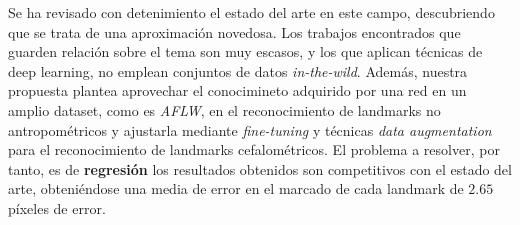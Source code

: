 \medskip

\noindent Se ha revisado con detenimiento el estado del arte en este campo, descubriendo que se trata de una aproximación novedosa. Los trabajos encontrados que guarden relación sobre el tema son muy escasos, y los que aplican técnicas de deep learning, no emplean conjuntos de datos \textit{in-the-wild}. Además, nuestra propuesta plantea aprovechar el conocimineto adquirido por una red en un amplio dataset, como es \textit{AFLW}, en el reconocimiento de landmarks no antropométricos y ajustarla mediante \textit{fine-tuning}  y técnicas \textit{data augmentation}  para el reconocimiento de landmarks cefalométricos. El problema a resolver, por tanto, es de \textbf{regresión} los resultados obtenidos son competitivos con el estado del arte, obteniéndose una media de error en el marcado de cada landmark de $2.65$ píxeles de error.

\endinput

